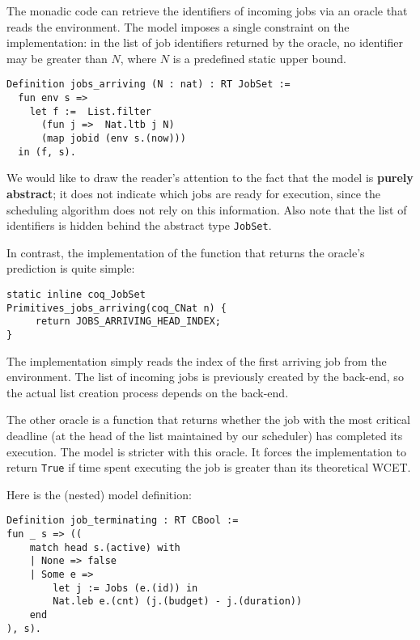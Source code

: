 	The monadic code can retrieve the identifiers of incoming jobs via an oracle that reads the environment. The model imposes a single constraint on the implementation: in the list of job identifiers returned by the oracle, no identifier may be greater than $N$, where $N$ is a predefined static upper bound. 

	\begin{verbatim}
Definition jobs_arriving (N : nat) : RT JobSet :=
  fun env s =>
    let f :=  List.filter
      (fun j =>  Nat.ltb j N)
      (map jobid (env s.(now))) 
  in (f, s).
	\end{verbatim}

	We would like to draw the reader's attention to the fact that the model is \textbf{purely abstract}; it does not indicate which jobs are ready for execution, since the scheduling algorithm does not rely on this information. Also note that the list of identifiers is hidden behind the abstract type \texttt{JobSet}.

	In contrast, the implementation of the function that returns the oracle's prediction is quite simple:

	\begin{verbatim}
static inline coq_JobSet
Primitives_jobs_arriving(coq_CNat n) {
     return JOBS_ARRIVING_HEAD_INDEX;
}
	\end{verbatim}

	The implementation simply reads the index of the first arriving job from the environment. The list of incoming jobs is previously created by the back-end, so the actual list creation process depends on the back-end.

	The other oracle is a function that returns whether the job with the most critical deadline (at the head of the list maintained by our scheduler) has completed its execution. The model is stricter with this oracle. It forces the implementation to return \texttt{True} if time spent executing the job is greater than its theoretical WCET.

	\vspace{1cm}

	Here is the (nested) model definition:

	\begin{verbatim}
Definition job_terminating : RT CBool :=
fun _ s => ((
    match head s.(active) with
    | None => false
    | Some e =>
        let j := Jobs (e.(id)) in
        Nat.leb e.(cnt) (j.(budget) - j.(duration))
    end
), s).
	\end{verbatim}

